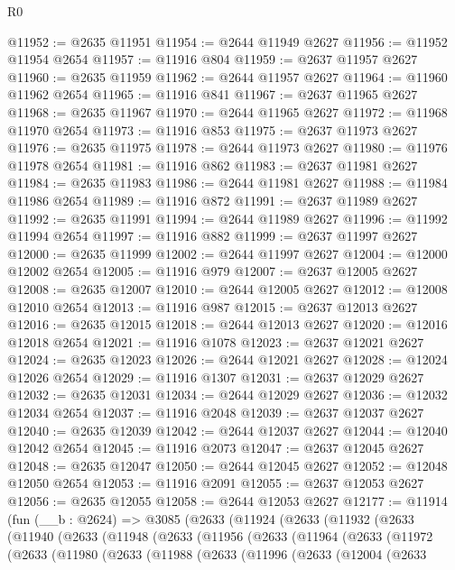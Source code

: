 \begin{lexlean}{R0}
\begin{coremodule}
@11952 := @2635 @11951
@11954 := @2644 @11949 @2627
@11956 := @11952 @11954 @2654
@11957 := @11916 @804
@11959 := @2637 @11957 @2627
@11960 := @2635 @11959
@11962 := @2644 @11957 @2627
@11964 := @11960 @11962 @2654
@11965 := @11916 @841
@11967 := @2637 @11965 @2627
@11968 := @2635 @11967
@11970 := @2644 @11965 @2627
@11972 := @11968 @11970 @2654
@11973 := @11916 @853
@11975 := @2637 @11973 @2627
@11976 := @2635 @11975
@11978 := @2644 @11973 @2627
@11980 := @11976 @11978 @2654
@11981 := @11916 @862
@11983 := @2637 @11981 @2627
@11984 := @2635 @11983
@11986 := @2644 @11981 @2627
@11988 := @11984 @11986 @2654
@11989 := @11916 @872
@11991 := @2637 @11989 @2627
@11992 := @2635 @11991
@11994 := @2644 @11989 @2627
@11996 := @11992 @11994 @2654
@11997 := @11916 @882
@11999 := @2637 @11997 @2627
@12000 := @2635 @11999
@12002 := @2644 @11997 @2627
@12004 := @12000 @12002 @2654
@12005 := @11916 @979
@12007 := @2637 @12005 @2627
@12008 := @2635 @12007
@12010 := @2644 @12005 @2627
@12012 := @12008 @12010 @2654
@12013 := @11916 @987
@12015 := @2637 @12013 @2627
@12016 := @2635 @12015
@12018 := @2644 @12013 @2627
@12020 := @12016 @12018 @2654
@12021 := @11916 @1078
@12023 := @2637 @12021 @2627
@12024 := @2635 @12023
@12026 := @2644 @12021 @2627
@12028 := @12024 @12026 @2654
@12029 := @11916 @1307
@12031 := @2637 @12029 @2627
@12032 := @2635 @12031
@12034 := @2644 @12029 @2627
@12036 := @12032 @12034 @2654
@12037 := @11916 @2048
@12039 := @2637 @12037 @2627
@12040 := @2635 @12039
@12042 := @2644 @12037 @2627
@12044 := @12040 @12042 @2654
@12045 := @11916 @2073
@12047 := @2637 @12045 @2627
@12048 := @2635 @12047
@12050 := @2644 @12045 @2627
@12052 := @12048 @12050 @2654
@12053 := @11916 @2091
@12055 := @2637 @12053 @2627
@12056 := @2635 @12055
@12058 := @2644 @12053 @2627
@12177 := @11914
    (fun (__b : @2624) =>
    @3085
      (@2633
        (@11924
          (@2633
            (@11932
              (@2633
                (@11940
                  (@2633
                    (@11948
                      (@2633
                        (@11956
                          (@2633
                            (@11964
                              (@2633
                                (@11972
                                  (@2633
                                    (@11980
                                      (@2633
                                        (@11988
                                          (@2633
                                            (@11996
                                              (@2633
                                                (@12004
                                                  (@2633

\end{coremodule}
\end{lexlean}
